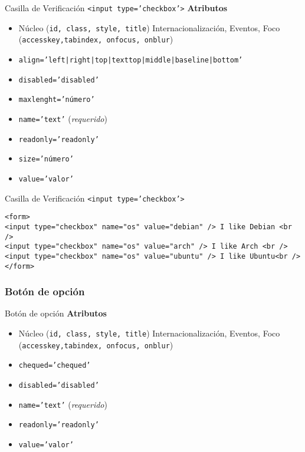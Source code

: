 \documentclass{beamer}
\begin{document}
\begin{frame}[fragile]{Casilla de Verificación \texttt{<input type='checkbox'>}} %
    \textbf{Atributos}
    \begin{itemize}
        \item Núcleo (\texttt{id, class, style, title}) Internacionalización,
        Eventos, Foco (\texttt{accesskey,tabindex, onfocus, onblur})
        \item \texttt{align='left|right|top|texttop|middle|baseline|bottom'}
        \item \texttt{disabled='disabled'}
        \item \texttt{maxlenght='número'}
        \item \texttt{name='text'} (\textit{requerido})
        \item \texttt{readonly='readonly'}
        \item \texttt{size='número'}
        \item \texttt{value='valor'}
    \end{itemize}
\end{frame}


\begin{frame}[fragile]{Casilla de Verificación \texttt{<input type='checkbox'>}} %
\footnotesize{
    \begin{lstlisting}
<form>
<input type="checkbox" name="os" value="debian" /> I like Debian <br />
<input type="checkbox" name="os" value="arch" /> I like Arch <br /> 
<input type="checkbox" name="os" value="ubuntu" /> I like Ubuntu<br /> 
</form>
    \end{lstlisting}
}
\end{frame}

\subsubsection{Botón de opción} 
\begin{frame}{Botón de opción} %
    \textbf{Atributos}
    \begin{itemize}
        \item Núcleo (\texttt{id, class, style, title}) Internacionalización,
        Eventos, Foco (\texttt{accesskey,tabindex, onfocus, onblur})
        \item \texttt{chequed='chequed'}
        \item \texttt{disabled='disabled'}
        \item \texttt{name='text'} (\textit{requerido})
        \item \texttt{readonly='readonly'}
        \item \texttt{value='valor'}
    \end{itemize}
    
\end{frame}
\end{document}
